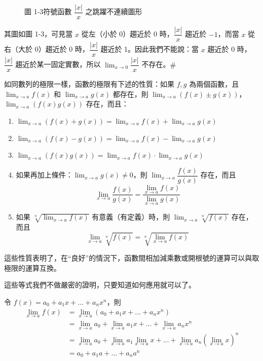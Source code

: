 \begin{figure}[H]
\centering
{}
\caption{圖 1-3\quad 符號函數 $\dfrac{|x|}{x}$ 之跳躍不連續圖形}
\label{fig:b6-app4-signum}
\end{figure}

其圖如圖 1-3，可見當 $x$ 從左（小於 0）趨近於 0 時，$\dfrac{|x|}{x}$ 趨近於 $-1$，而當 $x$ 從右（大於 0）趨近於 0 時，$\dfrac{|x|}{x}$ 趨近於 1。因此我們不能說：當 $x$ 趨近於 0 時，$\dfrac{|x|}{x}$ 趨近於某一固定實數，所以 $\lim_{x\to 0}\dfrac{|x|}{x}$ 不存在。\hfill$\#$

如同數列的極限一樣，函數的極限有下述的性質：如果 $f, g$ 為兩個函數，且 $\lim_{x\to a} f(x)$ 和 $\lim_{x\to a} g(x)$ 都存在，則 $\lim_{x\to a}(f(x)\pm g(x))$，$\lim_{x\to a}(f(x)g(x))$ 存在，而且：
\begin{enumerate}[label=\Roman*., leftmargin=2em]
  \item $\lim_{x\to a}(f(x)+g(x)) = \lim_{x\to a}f(x) + \lim_{x\to a}g(x)$
  \item $\lim_{x\to a}(f(x)-g(x)) = \lim_{x\to a}f(x) - \lim_{x\to a}g(x)$
  \item $\lim_{x\to a}(f(x)g(x)) = \lim_{x\to a}f(x) \cdot \lim_{x\to a}g(x)$
  \item 如果再加上條件：$\lim_{x\to a}g(x)\ne 0$，則 $\lim_{x\to a}\dfrac{f(x)}{g(x)}$ 存在，而且
  \[ \lim_{x\to a}\dfrac{f(x)}{g(x)} = \dfrac{\lim_{x\to a}f(x)}{\lim_{x\to a}g(x)} \]
  \item 如果 $\sqrt[n]{\lim_{x\to a}f(x)}$ 有意義（有定義）時，則 $\lim_{x\to a}\sqrt[n]{f(x)}$ 存在，而且
  \[ \lim_{x\to a}\sqrt[n]{f(x)} = \sqrt[n]{\lim_{x\to a}f(x)} \]
\end{enumerate}

這些性質表明了，在“良好”的情況下，函數間相加減乘數或開根號的運算可以與取極限的運算互換。

這些等式我們不做嚴密的證明，只要知道如何應用就可以了。

\begin{discussion}\label{ex:b6-app4-disc1}\label{disc:b6-app4-1}
令 $f(x) = a_0 + a_1 x + \dots + a_n x^n$，則
\begin{align*}
\lim_{x\to a} f(x) &= \lim_{x\to a}(a_0 + a_1 x + \dots + a_n x^n) \\
&= \lim_{x\to a}a_0 + \lim_{x\to a}a_1 x + \dots + \lim_{x\to a}a_n x^n \\
&= \lim_{x\to a}a_0 + \lim_{x\to a}a_1\lim_{x\to a}x + \dots + \lim_{x\to a}a_n\left(\lim_{x\to a}x\right)^n \\
&= a_0 + a_1 a + \dots + a_n a^n
\end{align*}
\end{discussion}

